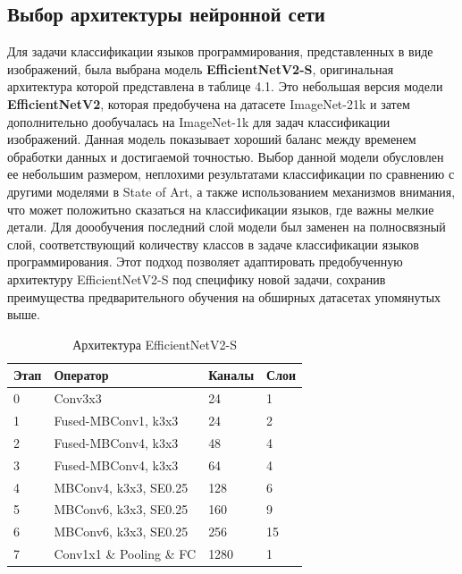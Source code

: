 {\subsection{Выбор архитектуры нейронной сети}
Для задачи классификации языков программирования, представленных в виде изображений, была выбрана модель \textbf{EfficientNetV2-S}, оригинальная архитектура которой представлена в таблице 4.1. Это небольшая версия модели \textbf{EfficientNetV2}, которая предобучена на датасете ImageNet-21k и затем дополнительно дообучалась на ImageNet-1k для задач классификации изображений. Данная модель показывает хороший баланс между временем обработки данных и
достигаемой точностью. Выбор данной модели обусловлен ее небольшим размером, неплохими результатами классификации по сравнению с другими моделями в State of Art, а также использованием механизмов внимания, что может положитьно сказаться на классификации языков, где важны мелкие детали.
Для доообучения последний слой модели был заменен на полносвязный слой, соответствующий количеству классов в задаче классификации языков программирования. Этот подход позволяет адаптировать предобученную архитектуру EfficientNetV2-S под специфику новой задачи, сохранив преимущества предварительного обучения на обширных датасетах упомянутых выше.
\begin{table}[h]
    \centering
    \renewcommand{\arraystretch}{1.5} %
    \begin{tabular}{|p{2.5cm}|p{4cm}|p{3cm}|p{2.5cm}|} %
        \hline
        \textbf{Этап} & \textbf{Оператор} & \textbf{Каналы} & \textbf{Слои} \\ %
        \hline
        0 & Conv3x3 & 24 & 1 \\ 
        \hline
        1 & Fused-MBConv1, k3x3 & 24 & 2 \\ 
        \hline
        2 & Fused-MBConv4, k3x3 & 48 & 4 \\ 
        \hline
        3 & Fused-MBConv4, k3x3 & 64 & 4 \\ 
        \hline
        4 & MBConv4, k3x3, SE0.25 & 128 & 6 \\ 
        \hline
        5 & MBConv6, k3x3, SE0.25 & 160 & 9 \\ 
        \hline
        6 & MBConv6, k3x3, SE0.25 & 256 & 15 \\ 
        \hline
        7 & Conv1x1 \& Pooling \& FC & 1280 & 1 \\ 
        \hline
    \end{tabular}
    \caption{Архитектура EfficientNetV2-S}
    \label{tab:example}
\end{table}


}
